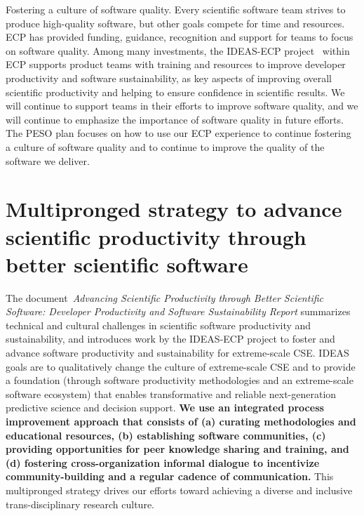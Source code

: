 {Fostering a culture of software quality.}
Every scientific software team strives to produce high-quality software, but other goals compete for time and resources.  ECP has provided funding, guidance, recognition and support for teams to focus on software quality.  Among many investments, the IDEAS-ECP project~\cite{ideas-ecp-report-2020,ideas-ecp-project-website} within ECP supports product teams with training and resources to improve developer productivity and software sustainability, as key aspects of improving overall scientific productivity and helping to ensure confidence in scientific results.  We will continue to support teams in their efforts to improve software quality, and we will continue to emphasize the importance of software quality in future efforts. The PESO plan focuses on how to use our ECP experience to continue fostering a culture of software quality and to continue to improve the quality of the software we deliver.
\fi

\section*{Multipronged strategy to advance scientific productivity through better scientific software}

The document~{\em Advancing Scientific Productivity through Better Scientific Software: Developer Productivity and Software Sustainability Report} \cite{ideas-ecp-report-2020}
summarizes technical and cultural challenges in scientific software productivity and sustainability, and introduces work by the IDEAS-ECP project to foster and advance software productivity and sustainability for extreme-scale CSE. IDEAS goals are to qualitatively change the culture of extreme-scale CSE and to provide a foundation (through software productivity methodologies and an extreme-scale software ecosystem) that enables transformative and reliable next-generation predictive science and decision support. {\bf We use an integrated process improvement approach that consists of (a) curating methodologies and educational resources, (b) establishing software communities, (c) providing opportunities for peer knowledge sharing and training,  and (d) fostering cross-organization informal dialogue to incentivize community-building and a regular cadence of communication.} This multipronged strategy drives our efforts toward achieving a diverse and inclusive trans-disciplinary research culture.

